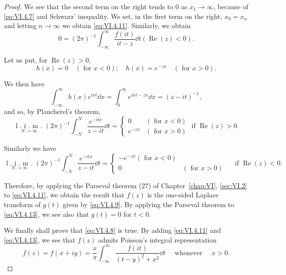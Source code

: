 \begin{proof}
We see that the second term on the right tends to $0$ as $x_{1} \to \infty$, because of \eqref{eq:VI.4.7} and Schwarz' inequality. We set, in the first term on the right, $x_{0} = x_{n}$ and letting $n \to \infty$ we obtain \eqref{eq:VI.4.11}. Similarly, we obtain 
\begin{equation}\label{eq:VI.4.13}
0 = (2 \pi) ^{-1} \int_{- \infty} ^{\infty} \frac {f (i t)}{i t - z} \dd t (\operatorname{Re} (z) < 0).
\end{equation}

Let us put, for $\operatorname{Re}(z) > 0$, 
\[
h (x) = 0 \quad (\text{ for } x < 0); \quad h (x) = e ^{-zx} \quad (\text{ for } x > 0).
\]

We then have 
\[
\int_{- \infty} ^{\infty} h (x) e ^{ixt} \dd x = \int_{0} ^{\infty} e ^{ixt-zx} \dd x = (z - i t) ^{-1},
\]
and so, by Plancherel's theorem, 
\begin{equation}\label{eq:VI.4.14}
\underset {N \rightarrow \infty} {\text{ l . i . m . }} (2 \pi) ^{-1} \int_{-N} ^{N} \frac {e ^{-itx}}{z - i t} \dd t = \begin{cases}0&(\text{ for } x < 0)\\e ^{-zx}&(\text{ for } x > 0)\end{cases} \text{ if } \operatorname{Re} (z) > 0.
\end{equation}

Similarly we have 
\begin{equation}\tag{14'}\label{eq:VI.4.14'}
\underset {N \rightarrow \infty} {\text{ l . i . m . }} (2 \pi) ^{-1} \int_{-N} ^{N} \frac {e ^{-itx}}{z - i t} \dd t = \begin{cases}- e ^{-zx} (\text{ for } x < 0)\\0&(\text{ for } x > 0)\end{cases} \quad \text{ if } \operatorname{Re} (z) < 0.
\end{equation}

Therefore, by applying the Parseval theorem ($27$) of Chapter~\ref{chap:VI}, \ref{sec:VI.2} to \eqref{eq:VI.4.11}, we obtain the result that $f(z)$ is the one-sided Laplace transform of $g(t)$ given by \eqref{eq:VI.4.9}. By applying the Parseval theorem to \eqref{eq:VI.4.13}, we see also that $g(t) = 0$ for $t < 0$. 


We finally shall prove that \eqref{eq:VI.4.8} is true. By adding \eqref{eq:VI.4.11} and \eqref{eq:VI.4.13}, we see that $f(z)$ admits Poisson's integral representation 
\begin{equation}\label{eq:VI.4.15}
f (z) = f (x + i y) = \frac {x}{\pi} \int_{- \infty} ^{\infty} \frac {f (i t)}{(t - y) ^{2} + x ^{2}} \dd t \quad \text{ whenever } \quad x > 0.
\end{equation}


\end{proof}
